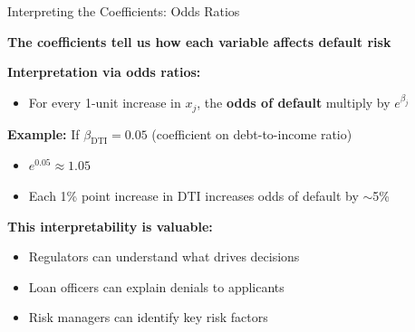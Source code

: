 \documentclass[10pt]{beamer}
\newcommand{\highlight}[1]{\textcolor{AccentOrange}{\textbf{#1}}}
\begin{document}
\begin{frame}{Interpreting the Coefficients: Odds Ratios}

  \textbf{The coefficients tell us how each variable affects default risk}

  \vspace{1em}
  \textbf{Interpretation via odds ratios:}
  \begin{itemize}
    \item For every 1-unit increase in $x_j$, the \highlight{odds of default} multiply by $e^{\beta_j}$
  \end{itemize}

  \vspace{0.5em}
  \textbf{Example:} If $\beta_{\text{DTI}} = 0.05$ (coefficient on debt-to-income ratio)
  \begin{itemize}
    \item $e^{0.05} \approx 1.05$
    \item Each 1\% point increase in DTI increases odds of default by $\sim$5\%
  \end{itemize}

  \vspace{1em}
  \textbf{This interpretability is valuable:}
  \begin{itemize}
    \item Regulators can understand what drives decisions
    \item Loan officers can explain denials to applicants
    \item Risk managers can identify key risk factors
  \end{itemize}
\end{frame}

\end{document}
